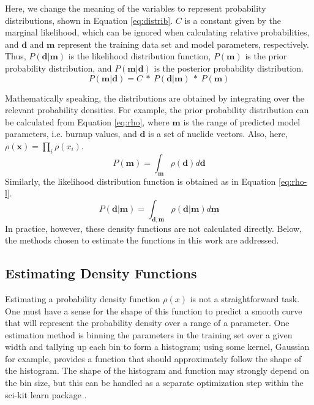Here, we change the meaning of the variables to represent probability
distributions, shown in Equation \ref{eq:distrib}.  $C$ is a constant given by
the marginal likelihood, which can be ignored when calculating relative
probabilities, and $\boldsymbol{d}$ and $\boldsymbol{m}$ represent the training
data set and model parameters, respectively. Thus,
$P(\boldsymbol{d}|\boldsymbol{m})$ is the likelihood distribution function,
$P(\boldsymbol{m})$ is the prior probability distribution, and
$P(\boldsymbol{m}|\boldsymbol{d})$ is the posterior probability distribution.
\begin{equation}
\label{eq:distrib}
  P(\boldsymbol{m}|\boldsymbol{d}) = C\ *\
  P(\boldsymbol{d}|\boldsymbol{m})\ *\ P(\boldsymbol{m})
\end{equation}

Mathematically speaking, the distributions are obtained by integrating over the
relevant probability densities.  For example, the prior probability
distribution can be calculated from Equation \ref{eq:rho}, where
$\boldsymbol{m}$ is the range of predicted model parameters, i.e. burnup
values, and $\boldsymbol{d}$ is a set of nuclide vectors. Also, here,
$\rho(\boldsymbol{x}) = \prod_{i} \rho(x_i)$. 
\begin{equation}
\label{eq:rho}
  P(\boldsymbol{m}) = \int_{\boldsymbol{m}} \rho(\boldsymbol{d}) d\boldsymbol{d}
\end{equation}
Similarly, the likelihood distribution function is obtained as in Equation 
\ref{eq:rho-l}.
\begin{equation}
\label{eq:rho-l}
  P(\boldsymbol{d}|\boldsymbol{m}) = \int_{\boldsymbol{d}, \boldsymbol{m}} \rho(\boldsymbol{d}|\boldsymbol{m}) d\boldsymbol{m}
\end{equation}
In practice, however, these density functions are not calculated directly.
Below, the methods chosen to estimate the functions in this work are addressed.

\subsection{Estimating Density Functions}

Estimating a probability density function $\rho(x)$ is not a straightforward
task.  One must have a sense for the shape of this function to predict a smooth
curve that will represent the probability density over a range of a parameter.
One estimation method is binning the parameters in the training set over a
given width and tallying up each bin to form a histogram; using some kernel,
Gaussian for example, provides a function that should approximately follow the
shape of the histogram. The shape of the histogram and function may strongly
depend on the bin size, but this can be handled as a separate optimization step
within the sci-kit learn package \cite{scikit}.


